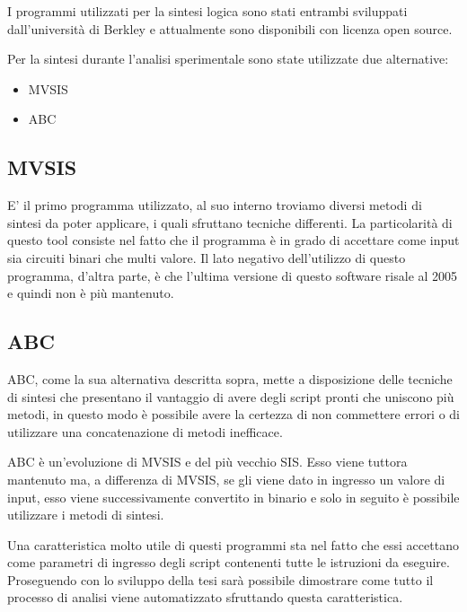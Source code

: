 \documentclass[
]{book}
\providecommand{\tightlist}{%
  \setlength{\itemsep}{0pt}\setlength{\parskip}{0pt}}
\begin{document}
I programmi utilizzati per la sintesi logica sono stati entrambi sviluppati dall'università di Berkley e attualmente sono disponibili con licenza open source.

Per la sintesi durante l'analisi sperimentale sono state utilizzate due alternative:

\begin{itemize}
\tightlist
\item
  MVSIS
\item
  ABC
\end{itemize}

\hypertarget{mvsis-1}{%
\subsection{MVSIS}\label{mvsis-1}}

E' il primo programma utilizzato, al suo interno troviamo diversi metodi di sintesi da poter applicare, i quali sfruttano tecniche differenti. La particolarità di questo tool consiste nel fatto che il programma è in grado di accettare come input sia circuiti binari che multi valore. Il lato negativo dell'utilizzo di questo programma, d'altra parte, è che l'ultima versione di questo software risale al 2005 e quindi non è più mantenuto.

\hypertarget{abc-1}{%
\subsection{ABC}\label{abc-1}}

ABC, come la sua alternativa descritta sopra, mette a disposizione delle tecniche di sintesi che presentano il vantaggio di avere degli script pronti che uniscono più metodi, in questo modo è possibile avere la certezza di non commettere errori o di utilizzare una concatenazione di metodi inefficace.

ABC è un'evoluzione di MVSIS e del più vecchio SIS. Esso viene tuttora mantenuto ma, a differenza di MVSIS, se gli viene dato in ingresso un valore di input, esso viene successivamente convertito in binario e solo in seguito è possibile utilizzare i metodi di sintesi.

Una caratteristica molto utile di questi programmi sta nel fatto che essi accettano come parametri di ingresso degli script contenenti tutte le istruzioni da eseguire. Proseguendo con lo sviluppo della tesi sarà possibile dimostrare come tutto il processo di analisi viene automatizzato sfruttando questa caratteristica.
\end{document}
